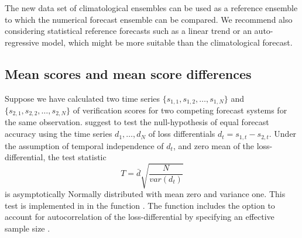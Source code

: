\documentclass[article]{jss}
\begin{document}
The new data set of climatological ensembles can be used as a reference ensemble to which the numerical forecast ensemble can be compared.
We recommend also considering statistical reference forecasts such as a linear trend or an auto-regressive model, which might be more suitable than the climatological forecast.



\subsection{Mean scores and mean score differences}

Suppose we have calculated two time series $\{s_{1,1}, s_{1,2}, \dots, s_{1,N}\}$ and $\{s_{2,1}, s_{2,2}, \dots, s_{2,N}\}$ of verification scores for two competing forecast systems for the same observation.
\citet{diebold1995comparing} suggest to test the null-hypothesis of equal forecast accuracy using the time series $d_1, \dots, d_N$ of loss differentials $d_t = s_{1,t} - s_{2,t}$. 
Under the assumption of temporal independence of $d_t$, and zero mean of the loss-differential, the test statistic 
%
\begin{equation}
T = \bar{d}\sqrt{\frac{N}{var(d_t)}}
\end{equation}
%
is asymptotically Normally distributed with mean zero and variance one.
This test is implemented in  in the function .
The function includes the option to account for autocorrelation of the loss-differential by specifying an effective sample size .
\end{document}
